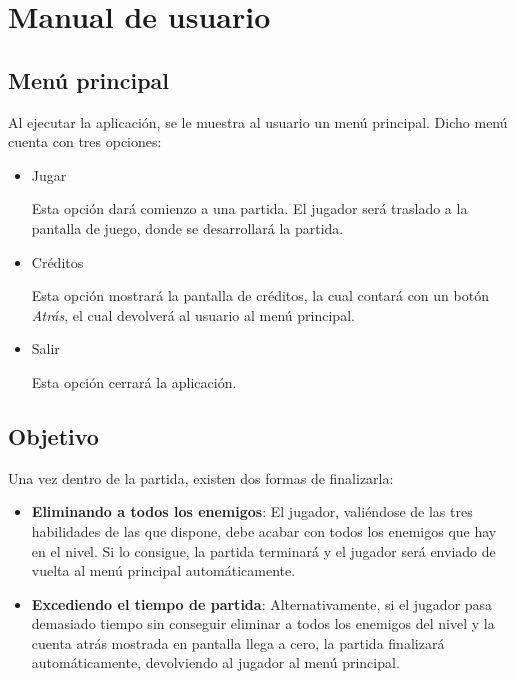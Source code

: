 \chapter{Manual de usuario}

	\section{Menú principal}

		Al ejecutar la aplicación, se le muestra al usuario un menú principal. Dicho menú cuenta con tres opciones:

		\begin{itemize}

			\item Jugar

				Esta opción dará comienzo a una partida. El jugador será traslado a la pantalla de juego, donde se desarrollará la partida.

			\item Créditos

				Esta opción mostrará la pantalla de créditos, la cual contará con un botón \textit{Atrás}, el cual devolverá al usuario al menú principal.

			\item Salir

				Esta opción cerrará la aplicación.

		\end{itemize}

	\section{Objetivo}

		Una vez dentro de la partida, existen dos formas de finalizarla:

		\begin{itemize}		

			\item \textbf{Eliminando a todos los enemigos}: El jugador, valiéndose de las tres habilidades de las que dispone, debe acabar con todos los enemigos que hay en el nivel. Si lo consigue, la partida terminará y el jugador será enviado de vuelta al menú principal automáticamente.

			\item \textbf{Excediendo el tiempo de partida}: Alternativamente, si el jugador pasa demasiado tiempo sin conseguir eliminar a todos los enemigos del nivel y la cuenta atrás mostrada en pantalla llega a cero, la partida finalizará automáticamente, devolviendo al jugador al menú principal.

		\end{itemize}

